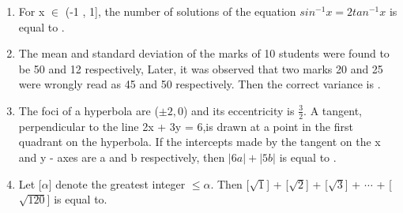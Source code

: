 \documentclass[journal]{IEEEtran}
\numberwithin{equation}{enumi}
\numberwithin{figure}{enumi}
\begin{document}
\begin{enumerate}
    \item For x $\in$ (-1 , 1], the number of solutions of the equation $sin^{-1}{x} = 2 tan^{-1}{x}$ is equal to \underline{\hspace{1cm}}. 
    \bigskip
    
    \item The mean and standard deviation of the marks of 10 students were found to be 50 and 12 respectively, Later, it was observed that two marks 20 and 25 were wrongly read as 45 and 50 respectively. Then the correct variance is  \underline{\hspace{1cm}}. 
    \bigskip
    
    \item The foci of a hyperbola are ($\pm2 , 0$) and its eccentricity is $\frac{3}{2}$. A tangent, perpendicular to the line 2x + 3y = 6,is drawn at a point in the first quadrant on the hyperbola. If the intercepts made by the tangent on the x and y - axes are a and b respectively, then $|6a| + |5b|$ is equal to \underline{\hspace{1cm}}. 
    \bigskip
    
    \item Let [$\alpha$] denote the greatest integer $\leq \alpha$. Then  [$\sqrt1$] + [$\sqrt2$] + [$\sqrt3$] + $\cdots$ + [$\sqrt{120}$]  is equal to\underline{\hspace{1cm}}.
\end{enumerate}
\end{document}
